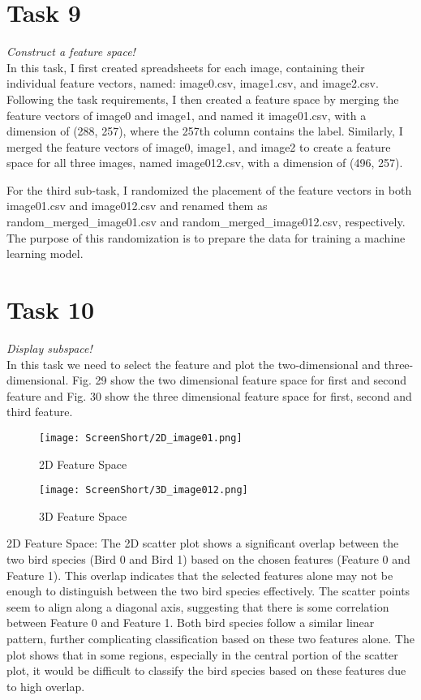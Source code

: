 \documentclass[conference,12pt]{IEEEtran}
\begin{document}
\section{Task 9}
\textit{Construct a feature space!}\\
In this task, I first created spreadsheets for each image, containing their individual feature vectors, named: image0.csv, image1.csv, and image2.csv. Following the task requirements, I then created a feature space by merging the feature vectors of image0 and image1, and named it image01.csv, with a dimension of (288, 257), where the 257th column contains the label. Similarly, I merged the feature vectors of image0, image1, and image2 to create a feature space for all three images, named image012.csv, with a dimension of (496, 257).

For the third sub-task, I randomized the placement of the feature vectors in both image01.csv and image012.csv and renamed them as random\_merged\_image01.csv and random\_merged\_image012.csv, respectively. The purpose of this randomization is to prepare the data for training a machine learning model.

\section{Task 10}
\textit{Display subspace!}\\
In this task we need to select the feature and plot the two-dimensional and three-dimensional. Fig. 29 show the two dimensional feature space for first and second feature and Fig. 30 show the three dimensional feature space for first, second and third feature. 
\begin{figure}[h]
    \centering
    \texttt{[image: ScreenShort/2D\_image01.png]}
    \caption{2D Feature Space}
\end{figure}

\begin{figure}[h]
    \centering
    \texttt{[image: ScreenShort/3D\_image012.png]}
    \caption{3D Feature Space}
\end{figure}

2D Feature Space: The 2D scatter plot shows a significant overlap between the two bird species (Bird 0 and Bird 1) based on the chosen features (Feature 0 and Feature 1). This overlap indicates that the selected features alone may not be enough to distinguish between the two bird species effectively.
The scatter points seem to align along a diagonal axis, suggesting that there is some correlation between Feature 0 and Feature 1. Both bird species follow a similar linear pattern, further complicating classification based on these two features alone.
The plot shows that in some regions, especially in the central portion of the scatter plot, it would be difficult to classify the bird species based on these features due to high overlap.
\end{document}
